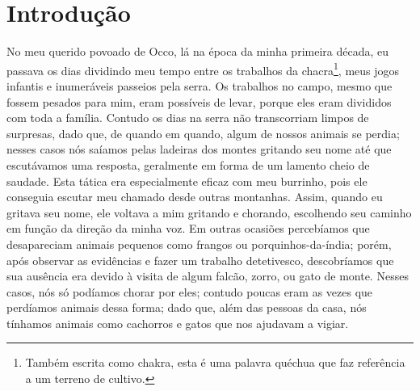 \cleardoublepage
\newpage
\ifdefined\EnableIncludeImages
\fi
\chapter*{Introdução} %

No meu querido povoado de Occo, lá na época da minha primeira década, eu passava os dias dividindo meu tempo entre os trabalhos da chacra\footnote{Também escrita como chakra, esta é uma palavra quéchua que faz referência a um terreno de cultivo.}, meus jogos infantis e inumeráveis passeios pela serra.
Os trabalhos no campo, mesmo que fossem pesados para mim, eram possíveis de levar, porque eles eram divididos com toda a família.
Contudo os dias na serra não transcorriam limpos de surpresas, dado que, de quando em quando, algum de nossos animais se perdia; nesses casos nós saíamos pelas ladeiras dos montes gritando seu nome até que escutávamos uma resposta, geralmente em forma de um lamento cheio de saudade.
Esta tática era especialmente eficaz com meu burrinho, pois ele conseguia escutar meu chamado desde outras montanhas. Assim, quando eu gritava seu nome, ele voltava a mim gritando e chorando, escolhendo seu caminho em função da direção da minha voz.
Em outras ocasiões percebíamos que desapareciam animais pequenos como frangos ou porquinhos-da-índia; porém, após observar as evidências e fazer um trabalho detetivesco, descobríamos que sua ausência era devido à visita de algum falcão, zorro, ou gato de monte.
Nesses casos, nós só podíamos chorar por eles; contudo poucas eram as vezes que perdíamos animais dessa forma; dado que, além das pessoas da casa, nós tínhamos animais como cachorros e gatos que nos ajudavam a vigiar.


